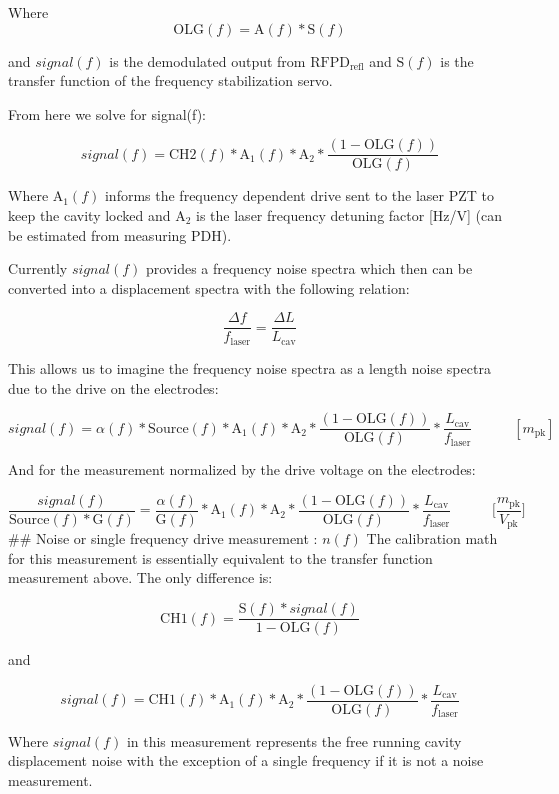 Where \[\mathrm{OLG}(f) = \mathrm{A}(f)* \mathrm{S}(f)\]

and \(signal(f)\) is the demodulated output from
\(\mathrm{RFPD}_\mathrm{refl}\) and \(\mathrm{S}(f)\) is the transfer
function of the frequency stabilization servo.

From here we solve for signal(f):

\[signal(f) = \mathrm{CH2}(f) * \mathrm{A}_{1}(f) * \mathrm{A}_2* \frac{(1-\mathrm{OLG}(f))}{\mathrm{OLG}(f)}\]

Where \(\mathrm{A}_{1}(f)\) informs the frequency dependent drive sent
to the laser PZT to keep the cavity locked and \(\mathrm{A}_2\) is the
laser frequency detuning factor {[}Hz/V{]} (can be estimated from
measuring PDH).

Currently \(signal(f)\) provides a frequency noise spectra which then
can be converted into a displacement spectra with the following
relation:

\[\frac{\Delta f}{f_\mathrm{laser}} = \frac{\Delta L}{L_\mathrm{cav}}\]

This allows us to imagine the frequency noise spectra as a length noise
spectra due to the drive on the electrodes:

\[signal(f) = \alpha(f)* \mathrm{Source}(f) * \mathrm{A}_{1}(f) * \mathrm{A}_2* \frac{(1-\mathrm{OLG}(f))}{\mathrm{OLG}(f)} * \frac{L_\mathrm{cav}}{f_\mathrm{laser}}\hspace{35pt} [m_\mathrm{pk}]\]

And for the measurement normalized by the drive voltage on the
electrodes:

\[\frac{signal(f)}{\mathrm{Source}(f) * \mathrm{G}(f)} = \frac{\alpha(f)}{\mathrm{G}(f)} * \mathrm{A}_{1}(f) * \mathrm{A}_2* \frac{(1-\mathrm{OLG}(f))}{\mathrm{OLG}(f)} * \frac{L_\mathrm{cav}}{f_\mathrm{laser}}\hspace{35pt} \bigg[\frac{m_\mathrm{pk}}{V_\mathrm{pk}}\bigg]\]
\#\# Noise or single frequency drive measurement : \(n(f)\) The
calibration math for this measurement is essentially equivalent to the
transfer function measurement above. The only difference is:

\[\mathrm{CH1}(f) = \frac{\mathrm{S}(f)* signal(f)}{1-\mathrm{OLG}(f)}\]

and

\[signal(f) = \mathrm{CH1}(f) * \mathrm{A}_{1}(f) * \mathrm{A}_2* \frac{(1-\mathrm{OLG}(f))}{\mathrm{OLG}(f)} * \frac{L_\mathrm{cav}}{f_\mathrm{laser}}\]

Where \(signal(f)\) in this measurement represents the free running
cavity displacement noise with the exception of a single frequency if it
is not a noise measurement.

